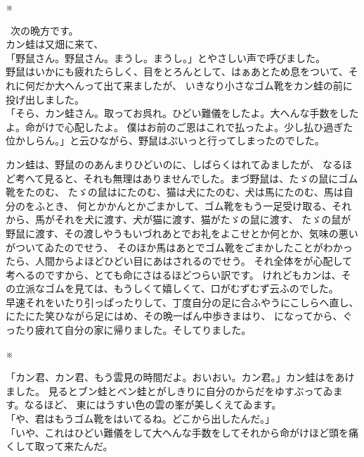 \documentclass[
a4paper,
10pt,
book]
{tarticle}
\begin{document}
\nolinenumbers
\indent \indent \indent \indent \indent \indent \indent \indent \indent \indent ※

\begin{linenumbers}
\noindent \, 次の晩方です。\\
\indent カン蛙は又畑に来て、\\
「野鼠さん。野鼠さん。まうし。まうし。」とやさしい声で呼びました。\\
\indent 野鼠はいかにも疲れたらしく、目をとろんとして、はぁあとため息をついて、それに何だか大へんって出て来ましたが、
いきなり小さなゴム靴をカン蛙の前に投げ出しました。\\
「そら、カン蛙さん。取ってお呉れ。ひどい難儀をしたよ。大へんな手数をしたよ。命がけで心配したよ。
僕はお前のご恩はこれで払ったよ。少し払ひ過ぎた位かしらん。」と云ひながら、野鼠はぷいっと行ってしまったのでした。
\end{linenumbers}

\newpage
\setcounter{page}{6}
\thispagestyle{fancy}
\begin{linenumbers}
\indent カン蛙は、野鼠ののあんまりひどいのに、しばらくはれてゐましたが、
なるほど考へて見ると、それも無理はありませんでした。まづ野鼠は、たゞの鼠にゴム靴をたのむ、
たゞの鼠はにたのむ、猫は犬にたのむ、犬は馬にたのむ、馬は自分のをふとき、
何とかかんとかごまかして、ゴム靴をもう一足受け取る、それから、馬がそれを犬に渡す、犬が猫に渡す、猫がたゞの鼠に渡す、
たゞの鼠が野鼠に渡す、その渡しやうもいづれあとでお礼をよこせとか何とか、気味の悪いがついてゐたのでせう、
そのほか馬はあとでゴム靴をごまかしたことがわかったら、人間からよほどひどい目にあはされるのでせう。
それ全体をが心配して考へるのですから、とても命にさはるほどつらい訳です。
けれどもカンは、その立派なゴムを見ては、もうしくて嬉しくて、口がむずむず云ふのでした。\\
\indent 早速それをいたり引っぱったりして、丁度自分の足に合ふやうにこしらへ直し、にたにた笑ひながら足にはめ、その晩一ばん中歩きまはり、
になってから、ぐったり疲れて自分の家に帰りました。そしてりました。
\end{linenumbers}

\nolinenumbers
\indent \indent \indent \indent \indent \indent \indent \indent \indent \indent ※

\begin{linenumbers}
「カン君、カン君、もう雲見の時間だよ。おいおい。カン君。」カン蛙はをあけました。
見るとブン蛙とベン蛙とがしきりに自分のからだをゆすぶってゐます。なるほど、
東にはうすい色の雲の峯が美しくえてゐます。\\
「や、君はもうゴム靴をはいてるね。どこから出したんだ。」\\
「いや、これはひどい難儀をして大へんな手数をしてそれから命がけほど頭を痛くして取って来たんだ。
\end{linenumbers}
\end{document}
